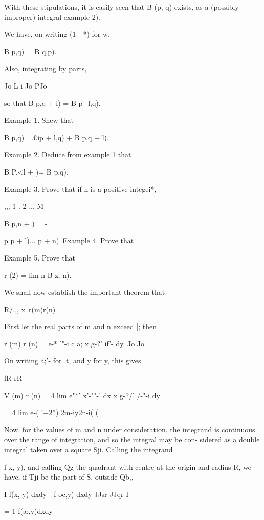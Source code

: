 With these stipulations, it is easily seen that B (p, q) exists, as a
(possibly improper) integral  example 2).

We have, on writing (1 - *) for w,

B p,q) = B q,p).

Also, integrating by parts,

Jo L i Jo PJo

so that B p,q + l) = B p+l,q).

Example 1. Shew that

B p,q)= £ip + l,q) + B p,q + l).

Example 2. Deduce from example 1 that

B P,<l + )= B p,q).

Example 3. Prove that if n is a positive integei*,

,,, 1 . 2 ... M

B p,n + ) = -

p p + l)... p + n)\ Example 4. Prove that

Example 5. Prove that

r (2) = lim n B z, n).


We shall now establish the important theorem that

R/.,, x\ r(m)r(n)

First let the real parts of m and n exceed |; then

r (m) r (n) = e-* '"-i c a; x g-?' if'- dy. Jo Jo

On writing a;'- for .t, and y for y, this gives

fR rR

V (m) r (n) = 4 lim e"*' x'-""-' dx x g-?/' /-"-i dy

= 4 lim e-( '+2'') 2m-iy2n-i( ( \

Now, for the values of m and n under consideration, the integrand is
continuous over the range of integration, and so the integral may be
con- sidered as a double integral taken over a square Sji. Calling the
integrand

%
%

f x, y), and calling Qg the quadrant with centre at the origin and
radius R, we have, if Tji be the part of S, outside Qb,,

I f(x, y) dxdy - f oc,y) dxdy JJsr JJqr I

= 1 f(a:,y)dxdy

